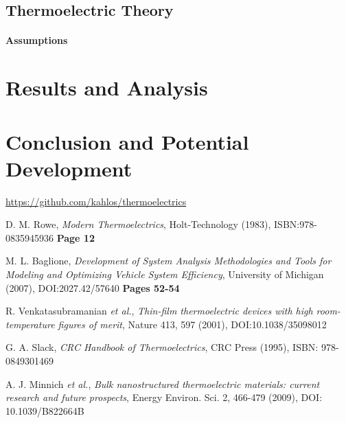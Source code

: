 \documentclass[12pt,titlepage,draft]{article}
\begin{document}
\subsection{Thermoelectric Theory}
\paragraph{Assumptions}

\section{Results and Analysis}

\section{Conclusion and Potential Development}

\url{https://github.com/kahlos/thermoelectrics}

\begin{thebibliography}{11}

D. M. Rowe,
\emph{Modern Thermoelectrics},
Holt-Technology (1983),
ISBN:978-0835945936
\textbf{Page 12}

M. L. Baglione,
\emph{Development of System Analysis Methodologies and Tools for Modeling and Optimizing Vehicle System Efficiency},
University of Michigan (2007),
DOI:2027.42/57640
\textbf{Pages 52-54}

R. Venkatasubramanian \emph{et al.},
\emph{Thin-film thermoelectric devices with high room-temperature figures of merit},
Nature 413,
597 (2001),
DOI:10.1038/35098012

G. A. Slack,
\emph{CRC Handbook of Thermoelectrics},
CRC Press (1995),
ISBN: 978-0849301469

A. J. Minnich \emph{et al.}, \emph{Bulk nanostructured thermoelectric materials: current research and future prospects}, Energy Environ. Sci. 2, 466-479 (2009), DOI: 10.1039/B822664B
\end{thebibliography}
\end{document}
